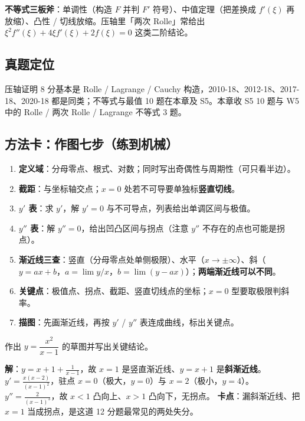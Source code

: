 \noindent\textbf{不等式三板斧}：单调性（构造 $F$ 并判 $F'$ 符号）、中值定理（把差换成 $f'(\xi)$ 再放缩）、凸性 / 切线放缩。压轴里「两次 Rolle」常给出 $\xi^{2}f''(\xi)+4\xi f'(\xi)+2f(\xi)=0$ 这类二阶结论。

\subsection{真题定位}
压轴证明 8 分基本是 Rolle / Lagrange / Cauchy 构造，2010-18、2012-18、2017-18、2020-18 都是同类；不等式与最值 10 题在本章及 S5。本章收 S5 10 题与 W5 中的 Rolle / 两次 Rolle / Lagrange 不等式 3 题。

\subsection{方法卡：作图七步（练到机械）}

\begin{enumerate}
\item \textbf{定义域}：分母零点、根式、对数；同时写出奇偶性与周期性（可只看半边）。
\item \textbf{截距}：与坐标轴交点；$x=0$ 处若不可导要单独标\textbf{竖直切线}。
\item \textbf{$y'$ 表}：求 $y'$，解 $y'=0$ 与不可导点，列表给出单调区间与极值。
\item \textbf{$y''$ 表}：解 $y''=0$，给出凹凸区间与拐点（注意 $y''$ 不存在的点也可能是拐点）。
\item \textbf{渐近线三查}：竖直（分母零点处单侧极限）、水平（$x\to\pm\infty$）、斜（$y=ax+b$，$a=\lim y/x$，$b=\lim(y-ax)$）；\textbf{两端渐近线可以不同}。
\item \textbf{关键点}：极值点、拐点、截距、竖直切线点的坐标；$x=0$ 型要取极限判斜率。
\item \textbf{描图}：先画渐近线，再按 $y'$ / $y''$ 表连成曲线，标出关键点。
\end{enumerate}

\begin{keypoint}
作出 $y=\dfrac{x^{2}}{x-1}$ 的草图并写出关键结论。

\noindent\textbf{解}：$y=x+1+\frac{1}{x-1}$，故 $x=1$ 是竖直渐近线、$y=x+1$ 是\textbf{斜渐近线}。
$y'=\frac{x(x-2)}{(x-1)^{2}}$，驻点 $x=0$（极大，$y=0$）与 $x=2$（极小，$y=4$）。
$y''=\frac{2}{(x-1)^{3}}$，故 $x<1$ 凸向上、$x>1$ 凸向下，无拐点。
\textbf{卡点}：漏斜渐近线、把 $x=1$ 当成拐点，是这道 12 分题最常见的两处失分。
\end{keypoint}

